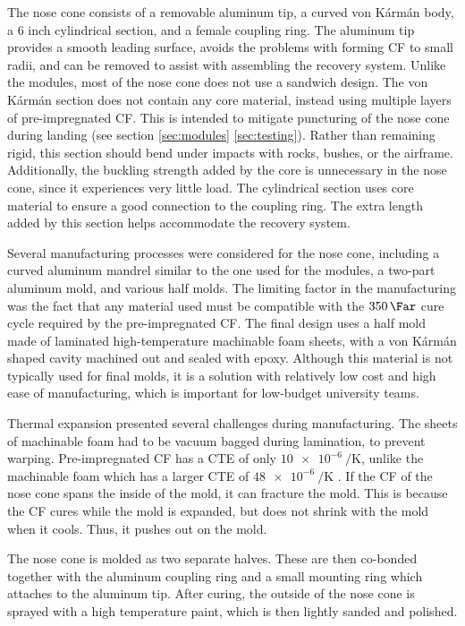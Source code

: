\documentclass{aiaa-tc}%
\begin{document}
The nose cone consists of a removable aluminum tip, a curved von K\'arm\'an body, a 6 inch cylindrical section, and a female coupling ring. 
The aluminum tip provides a smooth leading surface, avoids the problems with forming CF to small radii, and can be removed to assist with assembling the recovery system. 
Unlike the modules, most of the nose cone does not use a sandwich design.
The von K\'arm\'an section does not contain any core material, instead using multiple layers of pre-impregnated CF. 
This is intended to mitigate puncturing of the nose cone during landing (see section \ref{sec:modules} \ref{sec:testing}). 
Rather than remaining rigid, this section should bend under impacts with rocks, bushes, or the airframe. 
Additionally, the buckling strength added by the core is unnecessary in the nose cone, since it experiences very little load.
The cylindrical section uses core material to ensure a good connection to the coupling ring. 
The extra length added by this section helps accommodate the recovery system. 

Several manufacturing processes were considered for the nose cone, including a curved aluminum mandrel similar to the one used for the modules, a two-part aluminum mold, and various half molds. 
The limiting factor in the manufacturing was the fact that any material used must be compatible with the $\SI{350}{\Far}$ cure cycle required by the pre-impregnated CF. 
The final design uses a half mold made of laminated high-temperature machinable foam sheets, with a von K\'arm\'an shaped cavity machined out and sealed with epoxy. 
Although this material is not typically used for final molds, it is a solution with relatively low cost and high ease of manufacturing, which is important for low-budget university teams.

Thermal expansion presented several challenges during manufacturing. 
The sheets of machinable foam had to be vacuum bagged during lamination, to prevent warping.
Pre-impregnated CF has a CTE of only $\SI{10e-6}{\per\kelvin}$, unlike the machinable foam which has a larger CTE of $\SI{48e-6}{\per\kelvin}$ .
If the CF of the nose cone spans the inside of the mold, it can fracture the mold. 
This is because the CF cures while the mold is expanded, but does not shrink with the mold when it cools. Thus, it pushes out on the mold. 

The nose cone is molded as two separate halves. These are then co-bonded together with the aluminum coupling ring and a small mounting ring which attaches to the aluminum tip.
After curing, the outside of the nose cone is sprayed with a high temperature paint, which is then lightly sanded and polished.
\end{document}

